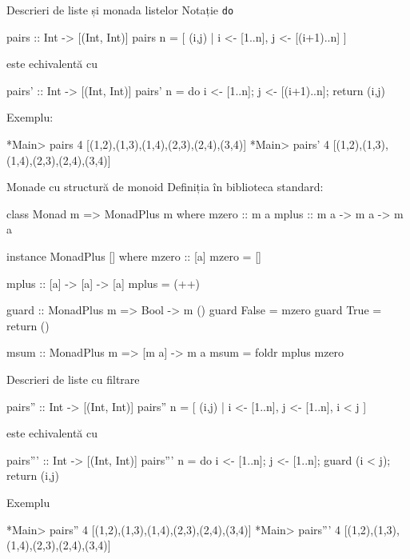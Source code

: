 \documentclass[xcolor=pdftex,romanian,colorlinks]{beamer}
\begin{document}
\begin{frame}[fragile]{Descrieri de liste și monada listelor}
{Notație \lstinline$do$}
\begin{asciihs}
   pairs :: Int -> [(Int, Int)]
   pairs n = [ (i,j) | i <- [1..n], j <- [(i+1)..n] ]
\end{asciihs}
este echivalentă cu
\begin{asciihs}
   pairs' :: Int -> [(Int, Int)]
   pairs' n = do {
                  i <- [1..n];
                  j <- [(i+1)..n];
                  return (i,j)
                }
\end{asciihs}
Exemplu:
\begin{asciihs}
   *Main> pairs 4
   [(1,2),(1,3),(1,4),(2,3),(2,4),(3,4)]
   *Main> pairs' 4
   [(1,2),(1,3),(1,4),(2,3),(2,4),(3,4)]
\end{asciihs}
\end{frame}


\begin{frame}[fragile]{Monade cu structură de monoid}
\vspace{-1ex}
Definiția în biblioteca standard:
\begin{asciihs}
   class Monad m => MonadPlus m where
     mzero :: m a
     mplus :: m a -> m a -> m a

   instance MonadPlus [] where
      mzero     :: [a]
      mzero     = []

      mplus     :: [a] -> [a] -> [a]
      mplus     = (++)

   guard :: MonadPlus m => Bool -> m ()
   guard False = mzero
   guard True   = return ()

   msum :: MonadPlus m => [m a] -> m a
   msum = foldr mplus mzero
\end{asciihs}
\end{frame}



\begin{frame}[fragile]{Descrieri de liste cu filtrare}
\begin{asciihs}
   pairs'' :: Int -> [(Int, Int)]
   pairs'' n = [ (i,j) | i <- [1..n], j <- [1..n], i < j ]
\end{asciihs}
este echivalentă cu
\begin{asciihs}
   pairs''' :: Int -> [(Int, Int)]
   pairs''' n = do {
                    i <- [1..n];
                    j <- [1..n];
                    guard (i < j);
                    return (i,j)
                  }
\end{asciihs}
Exemplu
\begin{asciihs}
   *Main> pairs'' 4
   [(1,2),(1,3),(1,4),(2,3),(2,4),(3,4)]
   *Main> pairs''' 4
   [(1,2),(1,3),(1,4),(2,3),(2,4),(3,4)]
\end{asciihs}
\end{frame}
\end{document}
